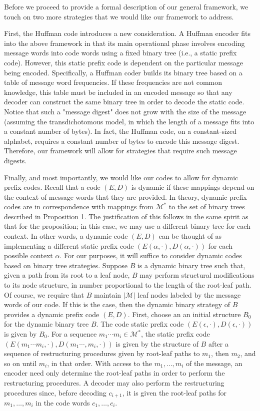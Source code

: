 \documentclass[twoside]{article}
\begin{document}
\begin{multicols}{2}
Before we proceed to provide a formal description of our general framework, we touch on two more strategies that we would like our framework to address.

First, the Huffman code introduces a new consideration. A Huffman encoder fits into the above framework in that its main operational phase involves encoding message words into code words using a fixed binary tree (i.e., a static prefix code). However, this static prefix code is dependent on the particular message being encoded. Specifically, a Huffman coder builds its binary tree based on a table of message word frequencies. If these frequencies are not common knowledge, this table must be included in an encoded message so that any decoder can construct the same binary tree in order to decode the static code. Notice that such a "message digest" does not grow with the size of the message (assuming the transdichotomous model, in which the length of a message fits into a constant number of bytes). In fact, the Huffman code, on a constant-sized alphabet, requires a constant number of bytes to encode this message digest. Therefore, our framework will allow for strategies that require such message digests.

Finally, and most importantly, we would like our codes to allow for dynamic prefix codes. Recall that a code $(E, D)$ is dynamic if these mappings depend on the context of message words that they are provided. In theory, dynamic prefix codes are in correspondence with mappings from $\mathcal{M}^*$ to the set of binary trees described in Proposition 1. The justification of this follows in the same spirit as that for the proposition; in this case, we may use a different binary tree for each context. In other words, a dynamic code $(E, D)$ can be thought of as implementing a different static prefix code $(E(\alpha, \cdot), D(\alpha, \cdot))$ for each possible context $\alpha$. For our purposes, it will suffice to consider dynamic codes based on binary tree strategies. Suppose $B$ is a dynamic binary tree such that, given a path from its root to a leaf node, $B$ may perform structural modifications to its node structure, in number proportional to the length of the root-leaf path. Of course, we require that $B$ maintain $|\mathcal{M}|$ leaf nodes labeled by the message words of our code. If this is the case, then the dynamic binary strategy of $B$ provides a dynamic prefix code $(E, D)$. First, choose an an initial structure $B_0$ for the dynamic binary tree $B$. The code static prefix code $(E(\epsilon, \cdot), D(\epsilon, \cdot))$ is given by $B_0$. For a sequence $m_1 \cdots m_i \in \mathcal{M}^*$, the static prefix code $(E(m_1 \cdots m_i, \cdot), D(m_1 \cdots, m_i, \cdot))$ is given by the structure of $B$ after a sequence of restructuring procedures given by root-leaf paths to $m_1$, then $m_2$, and so on until $m_i$, in that order. With access to the $m_1, \dots, m_i$ of the message, an encoder need only determine the root-leaf paths in order to perform the restructuring procedures. A decoder may also perform the restructuring procedures since, before decoding $c_{i+1}$, it is given the root-leaf paths for $m_1, \dots, m_i$ in the code words $c_1, \dots, c_i$.


\end{multicols}
\end{document}
